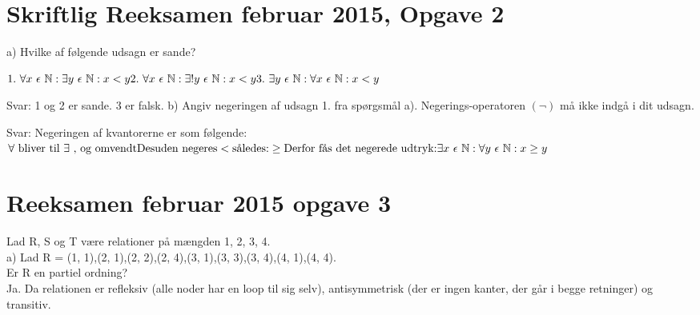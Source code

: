 \documentclass{article}
\begin{document}
\section{Skriftlig Reeksamen februar 2015, Opgave 2}
\newline
a) Hvilke af følgende udsagn er sande?
\begin{flushleft} \begin{math} 
1.\ \forall x \ \epsilon \ \Bbb N : \exists y \ \epsilon \ \Bbb N: x < y \newline
2.\ \forall x \ \epsilon \ \Bbb N : \exists ! y \ \epsilon \ \Bbb N: x < y \newline
3.\ \exists y \ \epsilon \ \Bbb N : \forall x \ \epsilon \ \Bbb N: x < y \newline
\end{math}

Svar: 1 og 2 er sande. 3 er falsk. \newline \newline
b) Angiv negeringen af udsagn 1. fra spørgsmål a). Negerings-operatoren $(\neg)$ må ikke indgå i dit udsagn.\newline

Svar:\newline
Negeringen af kvantorerne er som følgende:\newline
\begin{math}
\forall \ \textrm{bliver til} \ \exists \ \textrm{, og omvendt} \newline
\textrm{Desuden negeres} < \textrm{således:}\geq \newline
\textrm{Derfor fås det negerede udtryk:} \newline
\exists x \ \epsilon \ \mathbb N : \forall y \ \epsilon \ \mathbb N : x \geq y
\end{math}

\end{flushleft}


\section{Reeksamen februar 2015 opgave 3}
Lad R, S og T være relationer på mængden {1, 2, 3, 4}.\\

a) 
Lad R =  {(1, 1),(2, 1),(2, 2),(2, 4),(3, 1),(3, 3),(3, 4),(4, 1),(4, 4)}.\\
Er R en partiel ordning?\\
Ja. Da relationen er refleksiv (alle noder har en loop til sig selv), antisymmetrisk (der er ingen kanter, der går i begge retninger) og transitiv.\\
\end{document}
